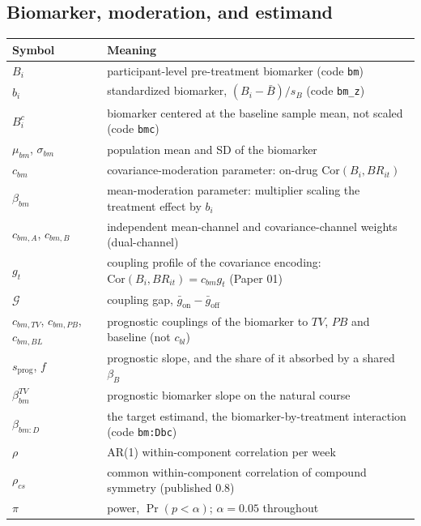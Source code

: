 \documentclass[11pt]{article}
\newcommand{\code}[1]{\texttt{#1}}
\begin{document}
\subsection{Biomarker, moderation, and estimand}

\begin{center}
\begin{tabular}{@{}lp{}@{}}
\toprule
Symbol & Meaning \\
\midrule
$B_i$ & participant-level pre-treatment biomarker (code \code{bm}) \\
$b_i$ & standardized biomarker, $(B_i - \bar B)/s_B$ (code \code{bm\_z}) \\
$B^c_i$ & biomarker centered at the baseline sample mean, not scaled (code \code{bmc}) \\
$\mu_{bm}$, $\sigma_{bm}$ & population mean and SD of the biomarker \\
$c_{bm}$ & covariance-moderation parameter: on-drug $\mathrm{Cor}(B_i, BR_{it})$ \\
$\beta_{bm}$ & mean-moderation parameter: multiplier scaling the treatment effect by $b_i$ \\
$c_{bm,A}$, $c_{bm,B}$ & independent mean-channel and covariance-channel weights (dual-channel) \\
$g_t$ & coupling profile of the covariance encoding: $\mathrm{Cor}(B_i, BR_{it}) = c_{bm} g_t$ (Paper 01) \\
$\mathcal G$ & coupling gap, $\bar g_{\mathrm{on}} - \bar g_{\mathrm{off}}$ \\
$c_{bm,TV}$, $c_{bm,PB}$, $c_{bm,BL}$ & prognostic couplings of the biomarker to $TV$, $PB$ and baseline (not $c_{bl}$) \\
$s_{\text{prog}}$, $f$ & prognostic slope, and the share of it absorbed by a shared $\beta_B$ \\
$\beta_{bm}^{TV}$ & prognostic biomarker slope on the natural course \\
$\beta_{bm:D}$ & the target estimand, the biomarker-by-treatment interaction (code \code{bm:Dbc}) \\
$\rho$ & AR(1) within-component correlation per week \\
$\rho_{cs}$ & common within-component correlation of compound symmetry (published 0.8) \\
$\pi$ & power, $\Pr(p < \alpha)$; $\alpha = 0.05$ throughout \\
\bottomrule
\end{tabular}
\end{center}
\end{document}
